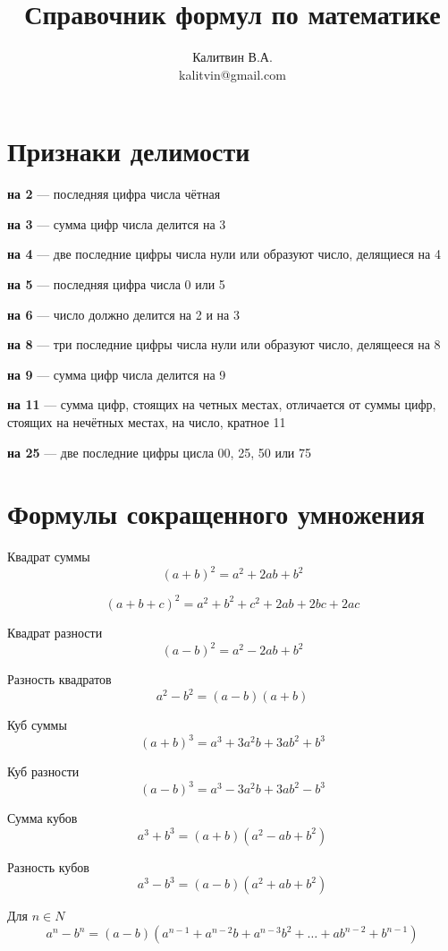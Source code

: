 \documentclass[a5paper, 8pt]{extarticle}
\begin{document}
\author{Калитвин В.А.\\
kalitvin@gmail.com}
\title{Справочник формул по математике}
\maketitle
\thispagestyle{empty}
\newpage

\section{Признаки делимости}

\textbf{на 2} --- последняя цифра числа чётная

\textbf{на 3} --- сумма цифр числа делится на 3

\textbf{на 4} --- две последние цифры числа нули или образуют число, делящиеся на 4

\textbf{на 5} --- последняя цифра числа 0 или 5

\textbf{на 6} --- число должно делится на 2 и на 3

\textbf{на 8} --- три последние цифры числа нули или образуют число, делящееся на 8

\textbf{на 9} --- сумма цифр числа делится на 9

\textbf{на 11} --- сумма цифр, стоящих на четных местах, отличается от суммы цифр, стоящих на нечётных местах, на число, кратное 11

\textbf{на 25} --- две последние цифры цисла 00, 25, 50 или 75


\section{Формулы сокращенного умножения}

Квадрат суммы
$$ (a+b)^2=a^2+2ab+b^2$$

$$ (a+b+c)^2=a^2+b^2+c^2+2ab+2bc+2ac$$

Квадрат разности
$$(a-b)^2=a^2-2ab+b^2$$

Разность квадратов
$$a^2-b^2=(a-b)(a+b)$$

Куб суммы
$$(a+b)^3=a^3+3a^2b+3ab^2+b^3$$

Куб разности
$$(a-b)^3=a^3-3a^2b+3ab^2-b^3$$

Сумма кубов
$$a^3+b^3=(a+b)(a^2-ab+b^2)$$

Разность кубов
$$a^3-b^3=(a-b)(a^2+ab+b^2)$$

Для $n\in N$
$$a^n-b^n=(a-b)(a^{n-1}+a^{n-2}b+a^{n-3}b^2+\dots +ab^{n-2}+b^{n-1})$$
\end{document}
